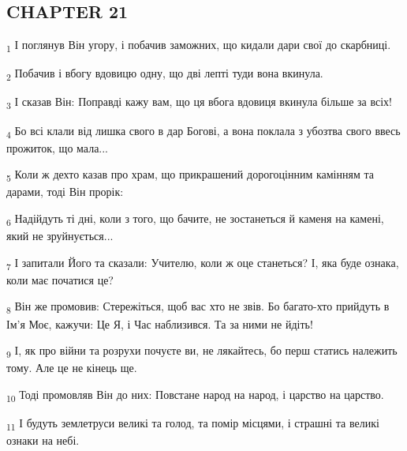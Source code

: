 \subsection{CHAPTER 21}
\begin{tcolorbox}
\textsubscript{1} І поглянув Він угору, і побачив заможних, що кидали дари свої до скарбниці.
\end{tcolorbox}
\begin{tcolorbox}
\textsubscript{2} Побачив і вбогу вдовицю одну, що дві лепті туди вона вкинула.
\end{tcolorbox}
\begin{tcolorbox}
\textsubscript{3} І сказав Він: Поправді кажу вам, що ця вбога вдовиця вкинула більше за всіх!
\end{tcolorbox}
\begin{tcolorbox}
\textsubscript{4} Бо всі клали від лишка свого в дар Богові, а вона поклала з убозтва свого ввесь прожиток, що мала...
\end{tcolorbox}
\begin{tcolorbox}
\textsubscript{5} Коли ж дехто казав про храм, що прикрашений дорогоцінним камінням та дарами, тоді Він прорік:
\end{tcolorbox}
\begin{tcolorbox}
\textsubscript{6} Надійдуть ті дні, коли з того, що бачите, не зостанеться й каменя на камені, який не зруйнується...
\end{tcolorbox}
\begin{tcolorbox}
\textsubscript{7} І запитали Його та сказали: Учителю, коли ж оце станеться? І, яка буде ознака, коли має початися це?
\end{tcolorbox}
\begin{tcolorbox}
\textsubscript{8} Він же промовив: Стережіться, щоб вас хто не звів. Бо багато-хто прийдуть в Ім'я Моє, кажучи: Це Я, і Час наблизився. Та за ними не йдіть!
\end{tcolorbox}
\begin{tcolorbox}
\textsubscript{9} І, як про війни та розрухи почуєте ви, не лякайтесь, бо перш статись належить тому. Але це не кінець ще.
\end{tcolorbox}
\begin{tcolorbox}
\textsubscript{10} Тоді промовляв Він до них: Повстане народ на народ, і царство на царство.
\end{tcolorbox}
\begin{tcolorbox}
\textsubscript{11} І будуть землетруси великі та голод, та помір місцями, і страшні та великі ознаки на небі.
\end{tcolorbox}
